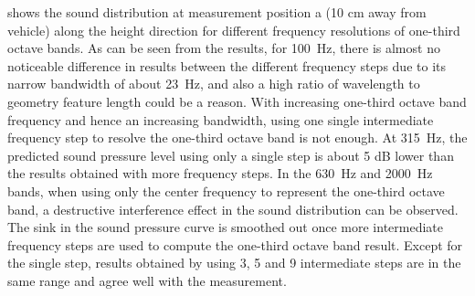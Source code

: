 \noindent{} shows the sound distribution at measurement position a (10 cm away from vehicle) along the height direction for different frequency resolutions of one-third octave bands. As can be seen from the results, for \SI{100}{\hertz}, there is almost no noticeable difference in results between the different frequency steps due to its narrow bandwidth of about \SI{23}{\hertz}, and also a high ratio of wavelength to geometry feature length could be a reason. With increasing one-third octave band frequency and hence an increasing bandwidth, using one single intermediate frequency step to resolve the one-third octave band is not enough. At \SI{315}{\hertz}, the predicted sound pressure level using only a single step is about 5 dB lower than the results obtained with more frequency steps. In the \SI{630}{\hertz} and \SI{2000}{\hertz} bands, when using only the center frequency to represent the one-third octave band, a destructive interference effect in the sound distribution can be observed. The sink in the sound pressure curve is smoothed out once more intermediate frequency steps are used to compute the one-third octave band result. Except for the single step, results obtained by using 3, 5 and 9 intermediate steps are in the same range and agree well with the measurement.

